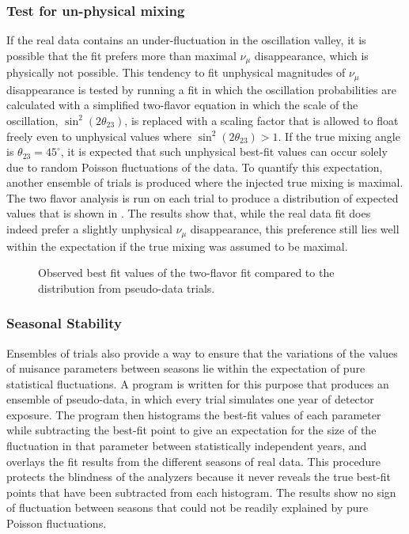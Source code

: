 \subsubsection{Test for un-physical mixing}
If the real data contains an under-fluctuation in the oscillation valley, it is possible that the fit prefers more than maximal $\nu_\mu$ disappearance, which is physically not possible. This tendency to fit unphysical magnitudes of $\nu_\mu$ disappearance is tested by running a fit in which the oscillation probabilities are calculated with a simplified two-flavor equation in which the scale of the oscillation, $\sin^2(2\theta_{23})$, is replaced with a scaling factor that is allowed to float freely even to unphysical values where $\sin^2(2\theta_{23}) > 1$. If the true mixing angle is $\theta_{23}=45^\circ$, it is expected that such unphysical best-fit values can occur solely due to random Poisson fluctuations of the data. To quantify this expectation, another ensemble of trials is produced where the injected true mixing is maximal. The two flavor analysis is run on each trial to produce a distribution of expected values that is shown in . The results show that, while the real data fit does indeed prefer a slightly unphysical $\nu_\mu$ disappearance, this preference still lies well within the expectation if the true mixing was assumed to be maximal.

\begin{figure}
    \centering
    
    \caption{Observed best fit values of the two-flavor fit compared to the distribution from pseudo-data trials.}
    \label{fig:two-flavor-ensemble}
\end{figure}

\subsubsection{Seasonal Stability}

Ensembles of trials also provide a way to ensure that the variations of the values of nuisance parameters between seasons lie within the expectation of pure statistical fluctuations. A program is written for this purpose that produces an ensemble of pseudo-data, in which every trial simulates one year of detector exposure. The program then histograms the best-fit values of each parameter while subtracting the best-fit point to give an expectation for the size of the fluctuation in that parameter between statistically independent years, and overlays the fit results from the different seasons of real data. This procedure protects the blindness of the analyzers because it never reveals the true best-fit points that have been subtracted from each histogram. The results show no sign of fluctuation between seasons that could not be readily explained by pure Poisson fluctuations.


